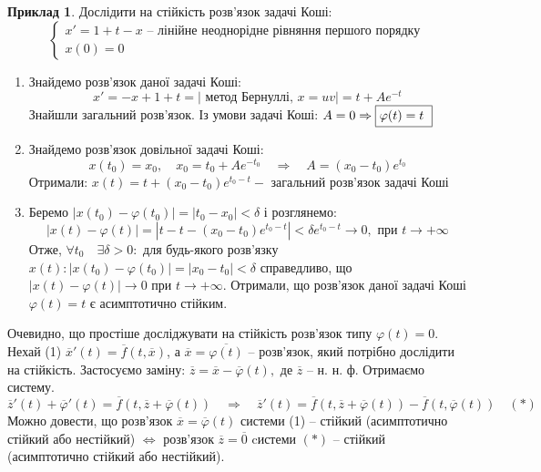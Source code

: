 \documentclass[14pt,a4paper]{scrartcl}
\theoremstyle{definition}
\newtheorem*{example}{Приклад}
\theoremstyle{definition}
\theoremstyle{definition}
\begin{document}
\begin{example}
    Дослідити на стійкість розв'язок  задачі Коші:
    $$
    \begin{cases}
        x' = 1 + t - x \text{  -- лінійне неоднорідне рівняння першого порядку}\\
        x(0) = 0
    \end{cases}
    $$
    \begin{enumerate}

    \item Знайдемо розв'язок даної задачі Коші:
    $$
    x' = - x + 1 + t = \left| \text{ метод Бернуллі, } x = uv \right| = t + Ae^{-t}
    $$
    Знайшли загальний розв'язок. Із умови задачі Коші: $ A = 0 \Rightarrow \fbox {$\varphi(t) = t$ }$

    \item Знайдемо розв'язок довільної задачі Коші:
    $$
    x(t_0) = x_0, \quad x_0 = t_0 + Ae^{-t_0} \quad \Rightarrow \quad A = (x_0 - t_0) e^{t_0}
    $$
    Отримали: $x(t) = t + (x_0 - t_0) e^{t_0 - t} - \text{ загальний розв'язок задачі Коші}$

    \item Беремо $\left| x(t_0) - \varphi(t_0) \right| = |t_0 - x_0| < \delta$ і розглянемо:
    $$\left| x(t) - \varphi(t) \right| = |t - t - (x_0 - t_0)e^{t_0 - t}| < \delta e^{t_0 - t} \rightarrow 0, \text{ при } t \rightarrow + \infty$$
    Отже, $\forall t_0 \quad \exists \delta > 0 :$ для будь-якого розв'язку $x(t): |x(t_0) - \varphi(t_0)| = |x_0 - t_0| < \delta$ справедливо, що $|x(t) - \varphi(t)| \rightarrow 0 \text{ при } t \rightarrow + \infty$. Отримали, що розв'язок даної задачі Коші $\varphi(t) = t$ є асимптотично стійким.
    \end{enumerate}
\end{example}

\remark
Очевидно, що простіше досліджувати на стійкість розв'язок типу $\varphi(t) = 0$. Нехай (1) $\overline{x}'(t) = \overline{f}(t, \overline{x})$, а $\overline{x} = \overline{\varphi(t)}$ -- розв'язок, який потрібно дослідити на стійкість. Застосуємо заміну: $\overline{z} = \overline{x} - \overline{\varphi}(t), \text{ де } \overline{z}$ -- н. н. ф. Отримаємо систему.
$$
\overline{z}'(t) + \overline{\varphi}'(t) = \overline{f}(t, \overline{z} + \overline{\varphi}(t)) \quad \Rightarrow \quad \overline{z}'(t) = \overline{f}(t, \overline{z} + \overline{\varphi}(t)) - \overline{f}(t, \overline{\varphi}(t)) \quad (*)
$$
Можно довести, що розв'язок $\overline{x} = \overline{\varphi}(t)$ системи (1) -- стійкий (асимптотично стійкий або нестійкий) $\Longleftrightarrow$ розв'язок $\overline{z} = \overline{0}$  cистеми $(*)$ -- стійкий (асимптотично стійкий або нестійкий).
\end{document}
